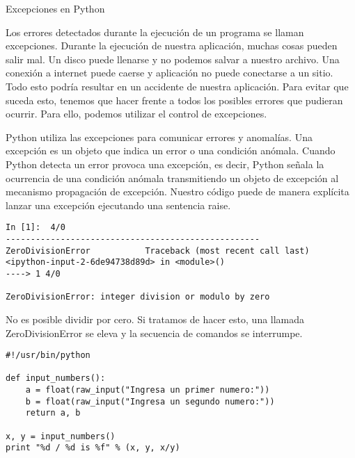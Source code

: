 \documentclass[twoside,10.5pt]{article}%
\begin{document}
\begin{center}
{\LARGE{Excepciones en Python}}\\[20pt]
\end{center}

\vspace{0.3cm}

Los errores detectados durante la ejecuci\'on de un programa se llaman {\color{red}excepciones}. Durante la ejecuci\'on de nuestra aplicaci\'on, muchas cosas pueden salir mal. Un disco puede llenarse y no podemos salvar a nuestro archivo. Una conexi\'on a internet puede caerse  y aplicaci\'on no puede conectarse a un sitio. Todo esto podr\'ia resultar en un accidente de nuestra aplicaci\'on. Para evitar que suceda esto, tenemos que hacer frente a todos los posibles errores que pudieran ocurrir. Para ello, podemos utilizar el {\color{red}control de excepciones}.

Python utiliza las excepciones para comunicar errores y anomal\'ias. Una excepci\'on es un objeto que indica un error o una condici\'on an\'omala. Cuando Python detecta un error provoca una excepci\'on, es decir, Python se\~nala la ocurrencia de una condici\'on an\'omala transmitiendo un objeto de excepci\'on al mecanismo {\color{blue} propagaci\'on de excepci\'on}. Nuestro c\'odigo puede de manera expl\'icita lanzar una excepci\'on ejecutando una sentencia {\color{blue} raise}.

\vspace{0.3cm}


\begin{verbatim}
In [1]:  4/0
---------------------------------------------------
ZeroDivisionError           Traceback (most recent call last)
<ipython-input-2-6de94738d89d> in <module>()
----> 1 4/0

ZeroDivisionError: integer division or modulo by zero

\end{verbatim}

\vspace{0.3cm}


No es posible dividir por cero. Si tratamos de hacer esto, una llamada ZeroDivisionError se eleva y la secuencia de comandos se interrumpe.

\vspace{0.3cm}

\begin{verbatim}
#!/usr/bin/python

def input_numbers():
    a = float(raw_input("Ingresa un primer numero:"))
    b = float(raw_input("Ingresa un segundo numero:"))
    return a, b

x, y = input_numbers()
print "%d / %d is %f" % (x, y, x/y)
\end{verbatim}
\end{document}
